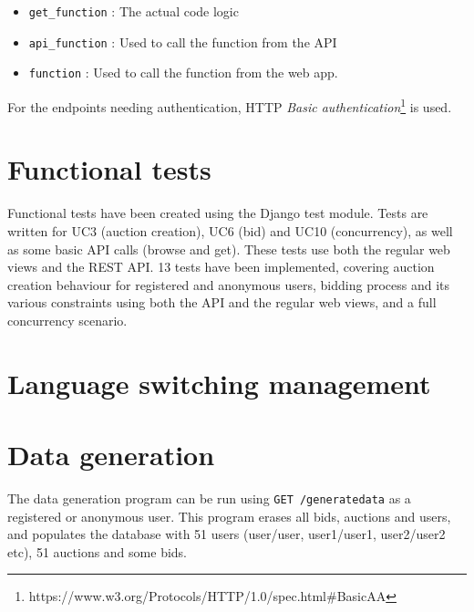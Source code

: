 \documentclass[a4paper, 11pt]{report}
\begin{document}
    \begin{itemize}
        \item \texttt{get\_function} : The actual code logic
        \item \texttt{api\_function} : Used to call the function from the API
        \item \texttt{function} : Used to call the function from the web app.
    \end{itemize}

    For the endpoints needing authentication, HTTP \textit{Basic authentication}\footnote{https://www.w3.org/Protocols/HTTP/1.0/spec.html\#BasicAA} is used. 

    \section{Functional tests}

    Functional tests have been created using the Django test module. Tests are written for UC3 (auction creation), UC6 (bid) and UC10 (concurrency), as well as some basic API calls (browse and get). These tests use both the regular web views and the REST API. 13 tests have been implemented, covering auction creation behaviour for registered and anonymous users, bidding process and its various constraints using both the API and the regular web views, and a full concurrency scenario. 

    \section{Language switching management}

    \section{Data generation}

    The data generation program can be run using \texttt{GET /generatedata} as a registered or anonymous user. This program erases all bids, auctions and users, and populates the database with 51 users (user/user, user1/user1, user2/user2 etc), 51 auctions and some bids. 
\end{document}
